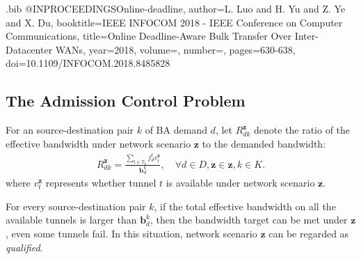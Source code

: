 \documentclass[sigconf]{acmart}
\begin{document}
\begin{filecontents}{\jobname.bib}
@INPROCEEDINGS{Online-deadline,
  author={L. {Luo} and H. {Yu} and Z. {Ye} and X. {Du}},
  booktitle={IEEE INFOCOM 2018 - IEEE Conference on Computer Communications}, 
  title={Online Deadline-Aware Bulk Transfer Over Inter-Datacenter WANs}, 
  year={2018},
  volume={},
  number={},
  pages={630-638},
  doi={10.1109/INFOCOM.2018.8485828}}
  



 \end{filecontents}
 



\clearpage

\begin{appendices}
 \section{The Admission Control Problem} \label{admission_problem}
 

For an source-destination pair $k$ of BA demand $d$, let $R_{dk}^{\mathbf{z}}$ denote the ratio of the effective bandwidth under network scenario $\mathbf{z}$ to the demanded bandwidth:
\begin{eqnarray} \label{R}
R_{dk}^{\mathbf{z}}=\frac{\sum_{t\in T_{k}}f_{d}^tv_t^{\mathbf{z}} }{\mathbf{b}^k_d}, \quad \forall  d \in D, \mathbf{z}\in \mathbf{z}, k \in K.
\end{eqnarray}
where $v_t^{\mathbf{z}}$ represents whether tunnel $t$ is available under network scenario $\mathbf{z}$.

For every source-destination pair $k$, if the total effective bandwidth on all the available tunnels is larger than $\mathbf{b}^k_d$,  then the bandwidth target can be met under $\mathbf{z}$, even some tunnels fail. In this situation, network scenario $\mathbf{z}$ can be regarded as \textit{qualified}.


\end{appendices}
\end{document}
